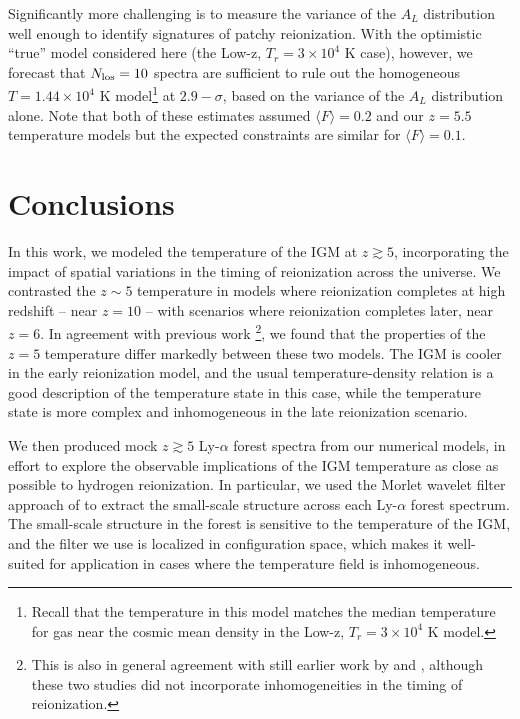 Significantly more challenging is to measure the variance of the $A_L$ distribution well enough to identify signatures of patchy
reionization. With the optimistic ``true'' model considered here (the Low-z, $T_r=3 \times 10^4$ K case), however, we forecast that
$N_{\rm los}=10$ spectra are sufficient to rule out the homogeneous $T=1.44 \times 10^4$ K model\footnote{Recall that the temperature in this model matches the median temperature for gas near the cosmic mean density in the Low-z, $T_r=3 \times 10^4$ K model.} at $2.9-\sigma$, based on the variance of the $A_L$ distribution alone. Note that both of these estimates assumed $\langle F \rangle=0.2$ and our $z=5.5$ temperature models but the
expected constraints are similar for $\langle F \rangle=0.1$.

  

\section{Conclusions}
\label{sec:IGMTempconclusions}

In this work, we modeled the temperature of the IGM at $z \gtrsim 5$, incorporating the impact of spatial
variations in the timing of reionization across the universe. We contrasted the $z \sim 5$ temperature in models
where reionization completes at high redshift -- near $z=10$ -- with scenarios where reionization completes
later, near $z = 6$. In agreement with previous work \citep{Trac:2008yz,Furlanetto:2009kr}\footnote{This is also
in general agreement with still earlier work by 
\citealt{Theuns:2002yc} and \citealt{Hui:2003hn}, although these two studies did not incorporate inhomogeneities in the
timing of reionization.}, we found
that the properties of the $z=5$ temperature differ markedly between these two models. The IGM is cooler in the
early reionization model, and the usual temperature-density relation is a good description of the temperature
state in this case, while the temperature state is more complex and inhomogeneous in the late reionization scenario.

We then produced mock $z \gtrsim 5$ Ly-$\alpha$ forest spectra from our numerical models, in effort to explore
the observable implications of the IGM temperature as close as possible to hydrogen reionization. In particular,
we used the Morlet wavelet filter approach of \citet{Lidz:2009ca} to extract the small-scale structure across
each Ly-$\alpha$ forest spectrum. The small-scale structure in the forest is sensitive to the temperature of the IGM,
and the filter we use is localized in configuration space, which makes it well-suited for application in cases
where the temperature field is inhomogeneous. 

